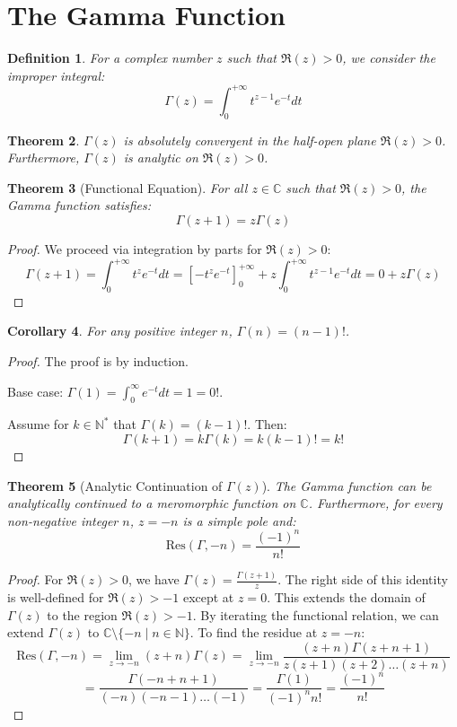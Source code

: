 \documentclass[a4paper,11pt]{article}
\newtheorem{theorem}{Theorem}
\newtheorem{corollary}[theorem]{Corollary}
\newtheorem{definition}[theorem]{Definition}
\begin{document}
\section{The Gamma Function}

\begin{definition}
  For a complex number $z$ such that $\Re(z) > 0$, we consider the
  improper integral:
  \[ \Gamma(z) = \int_{0}^{+\infty} t^{z-1} e^{-t} dt \]
\end{definition}

\begin{theorem}
  $\Gamma(z)$ is absolutely convergent in the half-open plane $\Re(z)
  > 0$. Furthermore, $\Gamma(z)$ is analytic on $\Re(z) > 0$.
\end{theorem}

\begin{theorem}[Functional Equation]
  For all $z \in \mathbb{C}$ such that $\Re(z) > 0$, the Gamma
  function satisfies:
  \[ \Gamma(z+1) = z \Gamma(z) \]
\end{theorem}

\begin{proof}
  We proceed via integration by parts for $\Re(z) > 0$:
  \[ \Gamma(z+1) = \int_{0}^{+\infty} t^z e^{-t} dt = \left[ -t^z
    e^{-t} \right]_{0}^{+\infty} + z \int_{0}^{+\infty} t^{z-1} e^{-t}
  dt = 0 + z \Gamma(z) \]
\end{proof}

\begin{corollary}
  For any positive integer $n$, $\Gamma(n) = (n-1)!$.
\end{corollary}

\begin{proof}
  The proof is by induction.

  Base case: $\Gamma(1) =
  \int_{0}^{\infty} e^{-t} dt = 1 = 0!$.

  Assume for $k \in \mathbb{N}^*$ that $\Gamma(k) = (k-1)!$. Then:
  \[ \Gamma(k+1) = k \Gamma(k) = k(k-1)! = k! \]
\end{proof}

\begin{theorem}[Analytic Continuation of $\Gamma(z)$]
  The Gamma function can be analytically continued to a meromorphic
  function on $\mathbb{C}$. Furthermore, for every non-negative
  integer $n$, $z = -n$ is a simple pole and:
  \[ \text{Res}(\Gamma, -n) = \frac{(-1)^n}{n!} \]
\end{theorem}

\begin{proof}
  For $\Re(z) > 0$, we have $\Gamma(z) = \frac{\Gamma(z+1)}{z}$. The
  right side of this identity is well-defined for $\Re(z) > -1$
  except at $z = 0$. This extends the domain of $\Gamma(z)$ to the
  region $\Re(z) > -1$. By iterating the functional relation, we can
  extend $\Gamma(z)$ to $\mathbb{C} \setminus \{ -n \mid n \in \mathbb{N} \}$.
  To find the residue at $z = -n$:
  \[ \text{Res}(\Gamma, -n) = \lim_{z \to -n} (z+n) \Gamma(z) =
  \lim_{z \to -n} \frac{(z+n)\Gamma(z+n+1)}{z(z+1)(z+2)\dots(z+n)} \]
  \[ = \frac{\Gamma(-n+n+1)}{(-n)(-n-1)\dots(-1)} =
  \frac{\Gamma(1)}{(-1)^n n!} = \frac{(-1)^n}{n!} \]
\end{proof}
\end{document}
